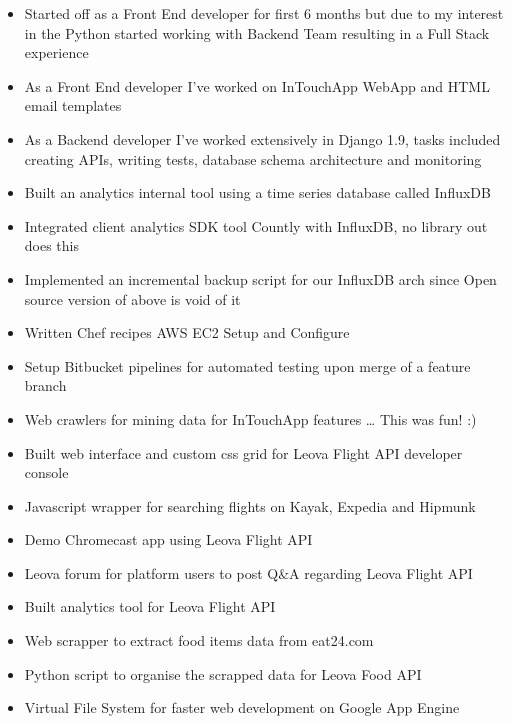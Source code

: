 \documentclass[10pt,a4paper]{altacv}
\begin{document}
\divider\smallskip

\begin{itemize}
\item Started off as a Front End developer for first 6 months but due to my interest in the
Python started working with Backend Team resulting in a Full Stack experience
\item As a Front End developer I’ve worked on InTouchApp WebApp and HTML email templates
\item As a Backend developer I’ve worked extensively in Django 1.9, tasks included
creating APIs, writing tests, database schema architecture and monitoring
\item Built an analytics internal tool using a time series database called InfluxDB
\item Integrated client analytics SDK tool Countly with InfluxDB, no library out does this
\item Implemented an incremental backup script for our InfluxDB arch since
Open source version of above is void of it
\item Written Chef recipes AWS EC2 Setup and Configure
\item Setup Bitbucket pipelines for automated testing upon merge of a feature branch
\item Web crawlers for mining data for InTouchApp features … This was fun! :)
\end{itemize}

\divider\smallskip

\begin{itemize}
\item Built web interface and custom css grid for Leova Flight API developer console
\item Javascript wrapper for searching flights on Kayak, Expedia and Hipmunk
\item Demo Chromecast app using Leova Flight API
\item Leova forum for platform users to post Q\&A regarding Leova Flight API
\item Built analytics tool for Leova Flight API
\item Web scrapper to extract food items data from eat24.com
\item Python script to organise the scrapped data for Leova Food API
\item Virtual File System for faster web development on Google App Engine
\end{itemize}

\newpage


\smallskip



\divider


\divider

\end{document}
